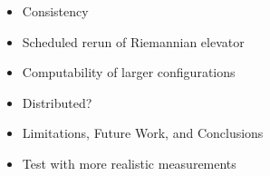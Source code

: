 \begin{itemize}
    \item Consistency
    \item Scheduled rerun of Riemannian elevator
    \item Computability of larger configurations
    \item Distributed? 
    \item Limitations, Future Work, and Conclusions
    \item Test with more realistic measurements
\end{itemize}
